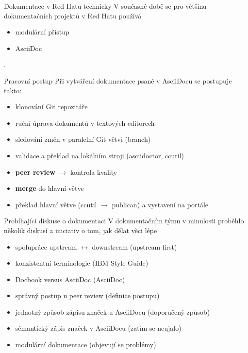 \documentclass[12pt]{beamer}
\begin{document}
	\begin{frame}{Dokumentace v Red Hatu technicky}
		V současné době se pro většinu dokumentačních projektů v Red Hatu používá 
		\begin{itemize}
			\item modulární přístup
			\item AsciiDoc
		\end{itemize}.
		
	\end{frame}

	\begin{frame}{Pracovní postup}
	Při vytváření dokumentace psané v AsciiDocu se postupuje takto:

	\begin{itemize}
		\item klonování Git repozitáře
		\item ruční úprava dokumentů v textových editorech
		\item sledování změn v paralelní Git větvi (branch)
		\item validace a překlad na lokálním stroji (asciidoctor, ccutil)
		\item \textbf{peer review} $\longrightarrow$ kontrola kvality
		\item \textbf{merge} do hlavní větve
		\item překlad hlavní větve (ccutil $\longrightarrow$ publican) a vystavení na portále
	\end{itemize}
	\end{frame}

	\begin{frame}{Probíhající diskuse o dokumentaci}
	V dokumentačním týmu v minulosti proběhlo několik diskusí a iniciativ o tom, jak dělat věci lépe
	
	\begin{itemize}
		\item spolupráce upstream $\longleftrightarrow$ downstream (upstream first)
		\item konzistentní terminologie (IBM Style Guide)
		\item Docbook versus AsciiDoc (AsciiDoc)
		\item správný postup u peer review (definice postupu)
		\item jednotný způsob zápisu značek u AsciiDocu (doporučený způsob)
		\item sémantický zápis značek v AsciiDocu (zatím se neujalo)
		\item modulární dokumentace (objevují se problémy)
	\end{itemize}
	\end{frame}
\end{document}
